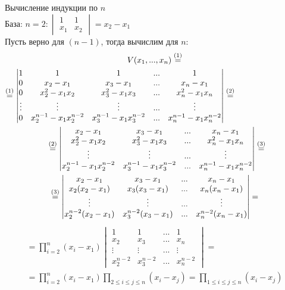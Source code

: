 \documentclass[a4paper, 12pt]{article}
\newcommand\tab[1][.5cm]{\hspace*{#1}}
\theoremstyle{definition}
\begin{document}
  Вычисление индукции по $n$ \\ 
  База: $n=2: \begin{vmatrix}
    1 & 1\\ x_1 & x_2 \end{vmatrix} = x_2 - x_1$ \\
  Пусть верно для $(n-1)$, тогда вычислим для $n$: 
  \begin{multline*}
    V(x_1,...,x_n) \overset{(1)}{=} \\ 
    \overset{(1)}{=} \begin{vmatrix}
      1 & 1 & 1 & ... & 1 \\
      0 & x_2-x_1 & x_3-x_1 & ... & x_n - x_1 \\
      0 & x_2^2 -x_1x_2 & x_3^2-x_1x_3 & ... & x_n^2-x_1x_n \\
      \vdots & \vdots & \vdots & ... & \vdots \\
      0 & x_2^{n-1}-x_1x_2^{n-2} & x_3^{n-1}-x_1x_3^{n-2} & ... & x_n^{n-1}-x_1x_n^{n-2}
    \end{vmatrix} \overset{(2)}{=} \tab[3cm]\\ 
    \overset{(2)}{=} \begin{vmatrix}
      x_2-x_1 & x_3-x_1 & ... & x_n - x_1 \\
      x_2^2 -x_1x_2 & x_3^2-x_1x_3 & ... & x_n^2-x_1x_n \\
      \vdots & \vdots & ... & \vdots \\
      x_2^{n-1}-x_1x_2^{n-2} & x_3^{n-1}-x_1x_3^{n-2} & ... & x_n^{n-1}-x_1x_n^{n-2}
    \end{vmatrix} \overset{(3)}{=} \tab[-0.2cm]\\
    \overset{(3)}{=} \begin{vmatrix}
    x_2-x_1 & x_3-x_1 & ... & x_n - x_1 \\
    x_2(x_2-x_1) & x_3(x_3-x_1) & ... & x_n(x_n-x_1) \\
    \vdots & \vdots & ... & \vdots \\
    x_2^{n-2}(x_2-x_1) & x_3^{n-2}(x_3-x_1) & ... & x_n^{n-2}(x_n-x_1)
    \end{vmatrix} =
  \end{multline*}
  \begin{multline*}
    = \prod\limits_{i=2}^{n}(x_i - x_1) \begin{vmatrix}
      1 & 1 & ... & 1\\
      x_2 & x_3 & ... & x_n\\
      \vdots & \vdots & ... & \vdots \\
      x_2^{n-2} & x_3^{n-2} & ... & x_n^{n-2}
      \end{vmatrix} = \\
      = \prod\limits_{i=2}^{n}(x_i - x_1)\prod\limits_{2\leq i \leq j \leq n} (x_i - x_j) = \prod\limits_{1\leq i \leq j \leq n} (x_i - x_j)
  \end{multline*}
\end{document}
